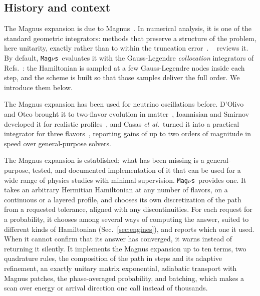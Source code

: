 \documentclass[final,5p,times,twocolumn,sort,compress]{elsarticle}
\makeatletter
\DeclareRobustCommand{\_}{%
  \ifmmode\nfss@text{\textunderscore}\else\textunderscore\allowbreak\fi}
\providecommand{\Ref}{}
\newcommand{\Refs}{Refs.}
\newcommand{\magnus}{{\tt Mag}\ensuremath{\nu}{\tt s}}
\makeatother
\begin{document}

\subsection{History and context}

The Magnus expansion is due to Magnus\ \cite{Magnus:1954zz}. In numerical analysis, it is one of the standard geometric integrators: methods that preserve a structure of the problem, here unitarity, exactly rather than to within the truncation error\ \cite{Iserles:2000acta, Hairer:2006gni}. \Ref\ \cite{Blanes:2008xlr} reviews it. By default, \magnus\ evaluates it with the Gauss-Legendre \emph{collocation} integrators of \Refs\ \cite{Blanes:2000bit, Blanes:2002opt}: the Hamiltonian is sampled at a few Gauss-Legendre nodes inside each step, and the scheme is built so that those samples deliver the full order. We introduce them below.

The Magnus expansion has been used for neutrino oscillations before. D'Olivo and Oteo brought it to two-flavor evolution in matter\ \cite{DOlivo:1990xs}, Ioannisian and Smirnov developed it for realistic profiles\ \cite{Ioannisian:2008ve}, and Casas \emph{et al.}\ turned it into a practical integrator for three flavors\ \cite{Casas:2016asi}, reporting gains of up to two orders of magnitude in speed over general-purpose solvers.

The Magnus expansion is established; what has been missing is a general-purpose, tested, and documented implementation of it that can be used for a wide range of physics studies with minimal supervision. \magnus\ provides one. It takes an arbitrary Hermitian Hamiltonian at any number of flavors, on a continuous or a layered profile, and chooses its own discretization of the path from a requested tolerance, aligned with any discontinuities. For each request for a probability, it chooses among several ways of computing the answer, suited to different kinds of Hamiltonian (Sec.~\ref{sec:engines}), and reports which one it used. When it cannot confirm that its answer has converged, it warns instead of returning it silently. It implements the Magnus expansion up to ten terms, two quadrature rules, the composition of the path in steps and its adaptive refinement, an exactly unitary matrix exponential, adiabatic transport with Magnus patches, the phase-averaged probability, and batching, which makes a scan over energy or arrival direction one call instead of thousands.
\end{document}
